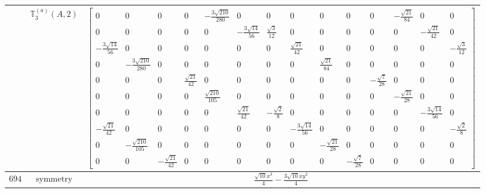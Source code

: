 \documentclass[fleqn,8pt,landscape]{jsarticle}
\begin{document}
\begin{longtable}{ccc}
$  $ & $ \mathbb{T}_{3}^{(a)}(A,2) $ & $ \begin{bmatrix} 0 & 0 & 0 & 0 & - \frac{3 \sqrt{210}}{280} & 0 & 0 & 0 & 0 & 0 & 0 & - \frac{\sqrt{21}}{84} & 0 & 0 \\ 0 & 0 & 0 & 0 & 0 & - \frac{3 \sqrt{14}}{56} & \frac{\sqrt{3}}{12} & 0 & 0 & 0 & 0 & 0 & - \frac{\sqrt{21}}{42} & 0 \\ - \frac{3 \sqrt{14}}{56} & 0 & 0 & 0 & 0 & 0 & 0 & \frac{\sqrt{21}}{42} & 0 & 0 & 0 & 0 & 0 & - \frac{\sqrt{3}}{12} \\ 0 & - \frac{3 \sqrt{210}}{280} & 0 & 0 & 0 & 0 & 0 & 0 & \frac{\sqrt{21}}{84} & 0 & 0 & 0 & 0 & 0 \\ 0 & 0 & 0 & \frac{\sqrt{21}}{42} & 0 & 0 & 0 & 0 & 0 & 0 & - \frac{\sqrt{7}}{28} & 0 & 0 & 0 \\ 0 & 0 & 0 & 0 & \frac{\sqrt{210}}{105} & 0 & 0 & 0 & 0 & 0 & 0 & - \frac{\sqrt{21}}{28} & 0 & 0 \\ 0 & 0 & 0 & 0 & 0 & \frac{\sqrt{21}}{42} & - \frac{\sqrt{2}}{8} & 0 & 0 & 0 & 0 & 0 & - \frac{3 \sqrt{14}}{56} & 0 \\ - \frac{\sqrt{21}}{42} & 0 & 0 & 0 & 0 & 0 & 0 & - \frac{3 \sqrt{14}}{56} & 0 & 0 & 0 & 0 & 0 & - \frac{\sqrt{2}}{8} \\ 0 & - \frac{\sqrt{210}}{105} & 0 & 0 & 0 & 0 & 0 & 0 & - \frac{\sqrt{21}}{28} & 0 & 0 & 0 & 0 & 0 \\ 0 & 0 & - \frac{\sqrt{21}}{42} & 0 & 0 & 0 & 0 & 0 & 0 & - \frac{\sqrt{7}}{28} & 0 & 0 & 0 & 0 \end{bmatrix} $ \\ \hline
$ 694 $ & $ \text{symmetry} $ & $ \frac{\sqrt{10} x^{3}}{4} - \frac{3 \sqrt{10} x y^{2}}{4} $ \\

\end{longtable}
\end{document}
